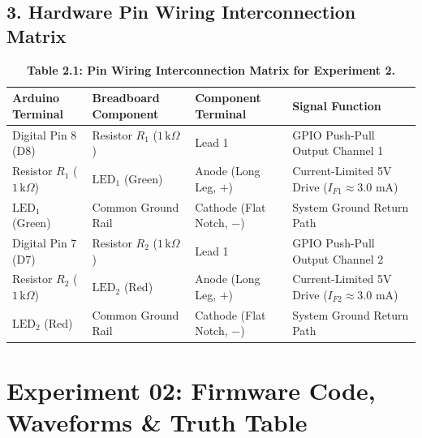 \documentclass[10pt,a4paper]{article}
\begin{document}
\subsection*{3. Hardware Pin Wiring Interconnection Matrix}
\begin{table}[H]
\centering
\small
\renewcommand{\arraystretch}{1.22}
\begin{tabularx}{\textwidth}{|l|l|l|X|}
\hline
\textbf{Arduino Terminal} & \textbf{Breadboard Component} & \textbf{Component Terminal} & \textbf{Signal Function} \\
\hline
Digital Pin 8 (D8) & Resistor $R_1$ ($1\,\text{k}\Omega$) & Lead 1 & GPIO Push-Pull Output Channel 1 \\
Resistor $R_1$ ($1\,\text{k}\Omega$) & $\text{LED}_1$ (Green) & Anode (Long Leg, $+$) & Current-Limited 5V Drive ($I_{F1} \approx 3.0\text{ mA}$) \\
$\text{LED}_1$ (Green) & Common Ground Rail & Cathode (Flat Notch, $-$) & System Ground Return Path \\
\hline
Digital Pin 7 (D7) & Resistor $R_2$ ($1\,\text{k}\Omega$) & Lead 1 & GPIO Push-Pull Output Channel 2 \\
Resistor $R_2$ ($1\,\text{k}\Omega$) & $\text{LED}_2$ (Red) & Anode (Long Leg, $+$) & Current-Limited 5V Drive ($I_{F2} \approx 3.0\text{ mA}$) \\
$\text{LED}_2$ (Red) & Common Ground Rail & Cathode (Flat Notch, $-$) & System Ground Return Path \\
\hline
\end{tabularx}
\caption{\textbf{Table 2.1: Pin Wiring Interconnection Matrix for Experiment 2.}}
\end{table}

\newpage

\section*{Experiment 02: Firmware Code, Waveforms \& Truth Table}
\end{document}
